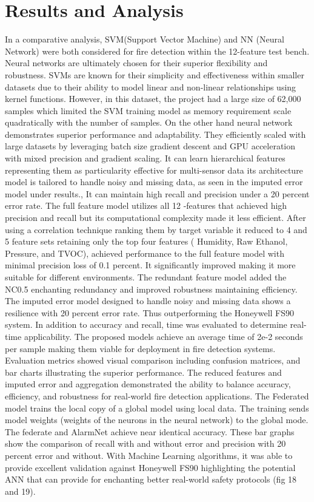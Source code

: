 \documentclass[conference]{IEEEtran}
\begin{document}
\section{Results and Analysis}
In a comparative analysis, SVM(Support Vector Machine) and
NN (Neural Network) were both considered for fire detection
within the 12-feature test bench. Neural networks are
ultimately chosen for their superior flexibility and
robustness. SVMs are known for their simplicity and
effectiveness within smaller datasets due to their ability
to model linear and non-linear relationships using kernel
functions. However, in this dataset, the project had a large
size of 62,000 samples which limited the SVM training model
as memory requirement scale quadratically with the number of
samples. On the other hand neural network demonstrates
superior performance and adaptability. They efficiently
scaled with large datasets by leveraging batch size gradient
descent and GPU acceleration with mixed precision and
gradient scaling. It can learn hierarchical features
representing them as particularity effective for
multi-sensor data its architecture model is tailored to
handle noisy and missing data, as seen in the imputed error
model under results., It can maintain high recall and
precision under a 20 percent error rate. The full feature
model utilizes all 12 -features that achieved high precision
and recall but its computational complexity made it less
efficient. After using a correlation technique ranking them
by target variable it reduced to 4 and 5 feature sets
retaining only the top four features ( Humidity, Raw
Ethanol, Pressure, and TVOC), achieved performance to the
full feature model with minimal precision loss of 0.1
percent. It significantly improved making it more suitable
for different environments. The redundant feature model
added the NC0.5 enchanting redundancy and improved
robustness maintaining efficiency. The imputed error model
designed to handle noisy and missing data shows a resilience
with 20 percent error rate. Thus outperforming the Honeywell
FS90 system. In addition to accuracy and recall, time was
evaluated to determine real-time applicability. The proposed
models achieve an average time of 2e-2 seconds per sample
making them viable for deployment in fire detection systems.
Evaluation metrics showed visual comparison including
confusion matrices, and bar charts illustrating the superior
performance. The reduced features and imputed error and
aggregation demonstrated the ability to balance accuracy,
efficiency, and robustness for real-world fire detection
applications. The Federated model trains the local copy of a
global model using local data. The training sends model
weights (weights of the neurons in the neural network) to
the global mode. The federate and AlarmNet achieve near
identical accuracy. These bar graphs show the comparison of
recall with and without error and precision with 20 percent
error and without. With Machine Learning algorithms, it was
able to provide excellent validation against Honeywell FS90
highlighting the potential ANN that can provide for
enchanting better real-world safety protocols (fig 18 and
19). 
\end{document}

